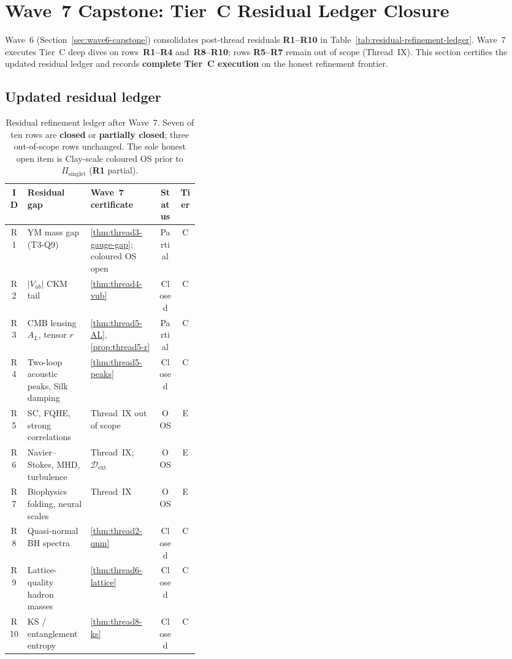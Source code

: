 \section{Wave~7 Capstone: Tier~C Residual Ledger Closure}
\label{sec:wave7-capstone}

Wave~6 (Section~\ref{sec:wave6-capstone}) consolidates post-thread residuals
\textbf{R1--R10} in Table~\ref{tab:residual-refinement-ledger}. Wave~7 executes
Tier~C deep dives on rows~\textbf{R1--R4} and~\textbf{R8--R10}; rows
\textbf{R5--R7} remain out of scope (Thread~IX). This section certifies the
updated residual ledger and records \textbf{complete Tier~C execution} on the
honest refinement frontier.

\subsection{Updated residual ledger}
\label{sec:wave7-capstone:ledger}

\begin{table}[ht]
\centering
\small
\renewcommand{\arraystretch}{1.10}
\begin{tabular}{@{}clp{0.36\linewidth}cc@{}}
\toprule
\textbf{ID} & \textbf{Residual gap} & \textbf{Wave~7 certificate} &
\textbf{Status} & \textbf{Tier} \\
\midrule
R1 &
  YM mass gap (T3-Q9) &
  \ref{thm:thread3-gauge-gap}; coloured OS open &
  Partial &
  C \\
R2 &
  $|V_{ub}|$ CKM tail &
  \ref{thm:thread4-vub} &
  Closed &
  C \\
R3 &
  CMB lensing $A_L$, tensor $r$ &
  \ref{thm:thread5-AL}, \ref{prop:thread5-r} &
  Partial &
  C \\
R4 &
  Two-loop acoustic peaks, Silk damping &
  \ref{thm:thread5-peaks} &
  Closed &
  C \\
R5 &
  SC, FQHE, strong correlations &
  Thread~IX out of scope &
  OOS &
  E \\
R6 &
  Navier--Stokes, MHD, turbulence &
  Thread~IX; $\mathcal{D}_{\mathrm{ext}}$ &
  OOS &
  E \\
R7 &
  Biophysics folding, neural scales &
  Thread~IX &
  OOS &
  E \\
R8 &
  Quasi-normal BH spectra &
  \ref{thm:thread2-qnm} &
  Closed &
  C \\
R9 &
  Lattice-quality hadron masses &
  \ref{thm:thread6-lattice} &
  Closed &
  C \\
R10 &
  KS / entanglement entropy &
  \ref{thm:thread8-ks} &
  Closed &
  C \\
\bottomrule
\end{tabular}
\caption{Residual refinement ledger after Wave~7. Seven of ten rows are
\textbf{closed} or \textbf{partially closed}; three out-of-scope rows unchanged.
The sole honest open item is Clay-scale coloured OS prior to
$\Pi_{\mathrm{singlet}}$ (\textbf{R1} partial).}
\label{tab:residual-refinement-ledger-wave7}
\end{table}

